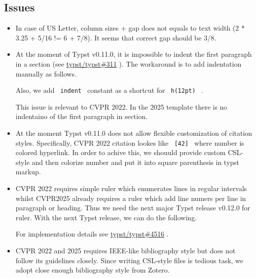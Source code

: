 \subsection{Issues}\label{issues}

\begin{itemize}
\item
  In case of US Letter, column sizes + gap does not equals to text width
  (2 * 3.25 + 5/16 != 6 + 7/8). It seems that correct gap should be 3/8.
\item
  At the moment of Typst v0.11.0, it is impossible to indent the first
  paragraph in a section (see
  \href{https://github.com/typst/typst/issues/311}{typst/typst\#311} ).
  The workaround is to add indentation manually as follows.

\begin{Shaded}
\begin{Highlighting}[]


\end{Highlighting}
\end{Shaded}

  Also, we add \texttt{\ indent\ } constant as a shortcut for
  \texttt{\ h(12pt)\ } .

  This issue is relevant to CVPR 2022. In the 2025 template there is no
  indentaino of the first paragraph in section.
\item
  At the moment Typst v0.11.0 does not allow flexible customization of
  citation styles. Specifically, CVPR 2022 citation lookes like
  \texttt{\ {[}42{]}\ } where number is colored hyperlink. In order to
  achive this, we shouuld provide custom CSL-style and then colorize
  number and put it into square parenthesis in typst markup.
\item
  CVPR 2022 requires simple ruler which enumerates lines in regular
  intervals whilst CVPR2025 already requires a ruler which add line
  numers per line in paragraph or heading. Thus we need the next major
  Typst release v0.12.0 for ruler. With the next Typst release, we can
  do the following.

\begin{Shaded}
\begin{Highlighting}[]
\end{Highlighting}
\end{Shaded}

  For implementation details see
  \href{https://github.com/typst/typst/pull/4516}{typst/typst\#4516} .
\item
  CVPR 2022 and 2025 requires IEEE-like bibliography style but does not
  follow its guidelines closely. Since writing CSL-style files is
  tedious task, we adopt close enough bibliography style from Zotero.
\end{itemize}

